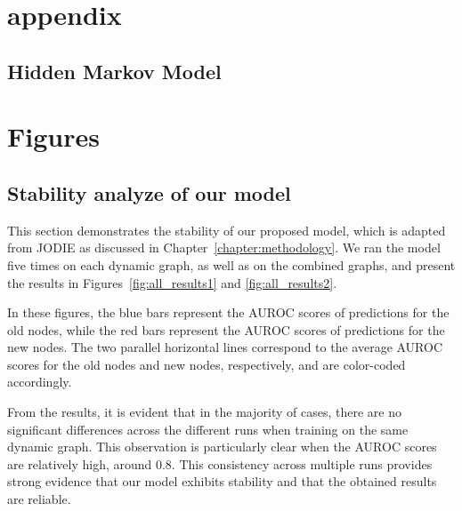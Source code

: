 \chapter{appendix}\label{chapter:appendixA}


\section{Hidden Markov Model}


\chapter{Figures}\label{chapter:appendixB}

\section{Stability analyze of our model}
This section demonstrates the stability of our proposed model, which is adapted from JODIE as discussed in Chapter~\ref{chapter:methodology}. We ran the model five times on each dynamic graph, as well as on the combined graphs, and present the results in Figures~\ref{fig:all_results1} and \ref{fig:all_results2}.

In these figures, the blue bars represent the AUROC scores of predictions for the old nodes, while the red bars represent the AUROC scores of predictions for the new nodes. The two parallel horizontal lines correspond to the average AUROC scores for the old nodes and new nodes, respectively, and are color-coded accordingly.

From the results, it is evident that in the majority of cases, there are no significant differences across the different runs when training on the same dynamic graph. This observation is particularly clear when the AUROC scores are relatively high, around 0.8. This consistency across multiple runs provides strong evidence that our model exhibits stability and that the obtained results are reliable.

